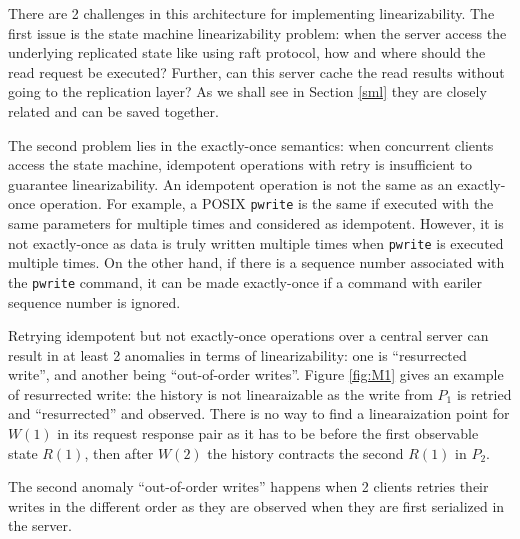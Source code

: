 There are 2 challenges in this architecture for implementing linearizability.
The first issue is the state machine linearizability problem: when the server
access the underlying replicated state like using raft protocol, how and
where should the read request be executed? Further, can this server cache the
read results without going to the replication layer? As we shall see in
Section \ref{sml} they are closely related and can be saved together.

The second problem lies in the exactly-once semantics: when concurrent
clients access the state machine, idempotent operations with retry is
insufficient to guarantee linearizability. An idempotent operation is not the
same as an exactly-once operation. For example, a POSIX \texttt{pwrite} is
the same if executed with the same parameters for multiple times and
considered as idempotent. However, it is not exactly-once as data is truly
written multiple times when \texttt{pwrite} is executed multiple times. On
the other hand, if there is a sequence number associated with the
\texttt{pwrite} command, it can be made exactly-once if a command with
eariler sequence number is ignored.

Retrying idempotent but not exactly-once operations over a central server can
result in at least 2 anomalies in terms of linearizability: one is
``resurrected write'', and another being ``out-of-order writes''. Figure
\ref{fig:M1} gives an example of resurrected write: the history is not
linearaizable as the write from $P_1$ is retried and ``resurrected'' and
observed. There is no way to find a linearaization point for $W(1)$ in its
request response pair as it has to be before the first observable state
$R(1)$, then after $W(2)$ the history contracts the second $R(1)$ in $P_2$.

The second anomaly ``out-of-order writes'' happens when 2 clients retries
their writes in the different order as they are observed when they are first
serialized in the server. 


